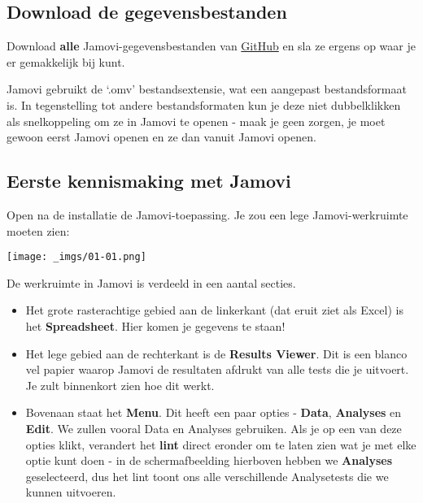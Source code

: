 \documentclass[
  letterpaper,
  DIV=11,
  numbers=noendperiod]{scrartcl}
\providecommand{\tightlist}{%
  \setlength{\itemsep}{0pt}\setlength{\parskip}{0pt}}\usepackage{longtable,booktabs,array}
\begin{document}
\hypertarget{download-de-gegevensbestanden}{%
\subsection{Download de
gegevensbestanden}\label{download-de-gegevensbestanden}}

Download \textbf{alle} Jamovi-gegevensbestanden van
\href{https://github.com/wdkeyzer/jamovi-worksheets/tree/master/00-Data-Files}{GitHub}
en sla ze ergens op waar je er gemakkelijk bij kunt.

Jamovi gebruikt de `.omv' bestandsextensie, wat een aangepast
bestandsformaat is. In tegenstelling tot andere bestandsformaten kun je
deze niet dubbelklikken als snelkoppeling om ze in Jamovi te openen -
maak je geen zorgen, je moet gewoon eerst Jamovi openen en ze dan vanuit
Jamovi openen.

\hypertarget{eerste-kennismaking-met-jamovi}{%
\subsection{Eerste kennismaking met
Jamovi}\label{eerste-kennismaking-met-jamovi}}

Open na de installatie de Jamovi-toepassing. Je zou een lege
Jamovi-werkruimte moeten zien:

\texttt{[image: \_imgs/01-01.png]}

De werkruimte in Jamovi is verdeeld in een aantal secties.

\begin{itemize}
\tightlist
\item
  Het grote rasterachtige gebied aan de linkerkant (dat eruit ziet als
  Excel) is het \textbf{Spreadsheet}. Hier komen je gegevens te staan!
\item
  Het lege gebied aan de rechterkant is de \textbf{Results Viewer}. Dit
  is een blanco vel papier waarop Jamovi de resultaten afdrukt van alle
  tests die je uitvoert. Je zult binnenkort zien hoe dit werkt.
\item
  Bovenaan staat het \textbf{Menu}. Dit heeft een paar opties -
  \textbf{Data}, \textbf{Analyses} en \textbf{Edit}. We zullen vooral
  Data en Analyses gebruiken. Als je op een van deze opties klikt,
  verandert het \textbf{lint} direct eronder om te laten zien wat je met
  elke optie kunt doen - in de schermafbeelding hierboven hebben we
  \textbf{Analyses} geselecteerd, dus het lint toont ons alle
  verschillende Analysetests die we kunnen uitvoeren.
\end{itemize}
\end{document}
